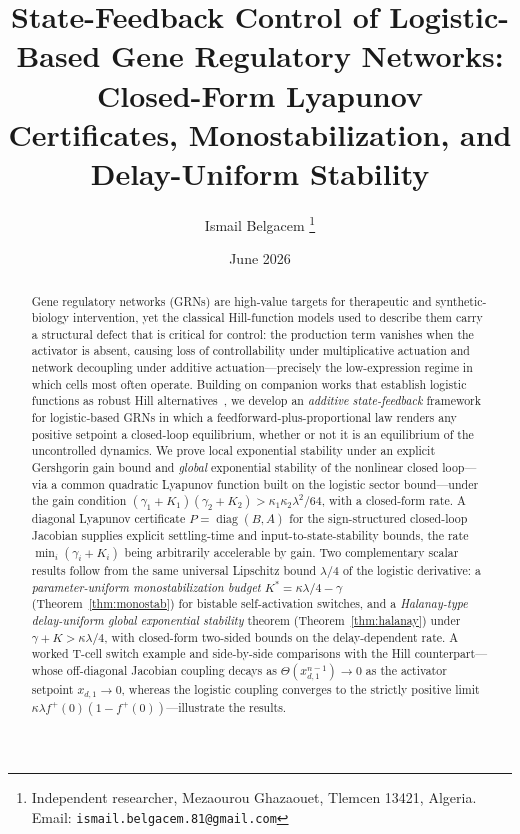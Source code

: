 \documentclass[12pt]{article}
\begin{document}
\title{State-Feedback Control of Logistic-Based Gene Regulatory
       Networks: Closed-Form Lyapunov Certificates, Monostabilization,
       and Delay-Uniform Stability}

\author{Ismail Belgacem%
  \thanks{Independent researcher, Mezaourou Ghazaouet, Tlemcen 13421, Algeria.\newline
           Email: \texttt{ismail.belgacem.81@gmail.com}}}

\date{June 2026}

\maketitle

\begin{abstract}
Gene regulatory networks (GRNs) are high-value targets for therapeutic and
synthetic-biology intervention, yet the classical Hill-function models used to
describe them carry a structural defect that is critical for control: the
production term vanishes when the activator is absent, causing loss of
controllability under multiplicative actuation and network decoupling under
additive actuation---precisely the low-expression regime in which cells most
often operate. Building on companion works that establish logistic functions as
robust Hill alternatives~\cite{belgacem2025exploring,belgacem2026logistic}, we develop
an \emph{additive state-feedback} framework for logistic-based GRNs in which a
feedforward-plus-proportional law renders any positive setpoint a closed-loop
equilibrium, whether or not it is an equilibrium of the uncontrolled dynamics.
We prove local exponential stability under an explicit Gershgorin gain bound and
\emph{global} exponential stability of the nonlinear closed loop---via a common
quadratic Lyapunov function built on the logistic sector bound---under the gain
condition $(\gamma_1+K_1)(\gamma_2+K_2)>\kappa_1\kappa_2\lambda^2/64$, with a
closed-form rate. A diagonal Lyapunov certificate $P=\operatorname{diag}(B,A)$
for the sign-structured closed-loop Jacobian supplies explicit settling-time and
input-to-state-stability bounds, the rate $\min_i(\gamma_i+K_i)$ being
arbitrarily accelerable by gain. Two complementary scalar results follow from the
same universal Lipschitz bound $\lambda/4$ of the logistic derivative: a
\emph{parameter-uniform monostabilization budget} $K^{*}=\kappa\lambda/4-\gamma$
(Theorem~\ref{thm:monostab}) for bistable self-activation switches, and a
\emph{Halanay-type delay-uniform global exponential stability} theorem
(Theorem~\ref{thm:halanay}) under $\gamma+K>\kappa\lambda/4$, with closed-form
two-sided bounds on the delay-dependent rate. A worked T-cell switch example and
side-by-side comparisons with the Hill counterpart---whose off-diagonal Jacobian
coupling decays as $\Theta(x_{d,1}^{n-1})\to 0$ as the activator setpoint
$x_{d,1}\to 0$, whereas the logistic coupling converges to the strictly positive
limit $\kappa\lambda f^+(0)(1-f^+(0))$---illustrate the results.
\end{abstract}
\end{document}
